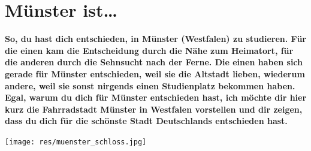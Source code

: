\section{Münster ist\dots}
\textbf{So, du hast dich entschieden, in Münster (Westfalen) zu studieren. Für die einen kam die Entscheidung durch die Nähe zum Heimatort, für die anderen durch die Sehnsucht nach der Ferne. Die einen haben sich gerade für Münster entschieden, weil sie die Altstadt lieben, wiederum andere, weil sie sonst nirgends einen Studienplatz bekommen haben. Egal, warum du dich für Münster entschieden hast, ich möchte dir hier kurz die Fahrradstadt Münster in Westfalen vorstellen und dir zeigen, dass du dich für die schönste Stadt Deutschlands entschieden hast.}

\begin{center}
\texttt{[image: res/muenster\_schloss.jpg]}
\end{center}

